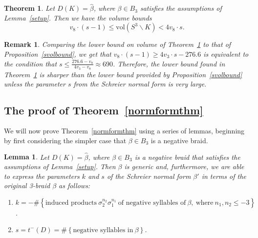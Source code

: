 \documentclass{article}
\newtheorem{remark}{Remark}[section]
\newtheorem{theorem}{Theorem}[section]
\newtheorem{lemma}{Lemma}[section]
\begin{document}
\begin{theorem}\label{newsvolbound}
Let $D(K)=\widehat{\beta}$, where $\beta \in B_{3}$ satisfies the assumptions of Lemma~\ref{setup}. Then we have the volume bounds
$$v_{8}\cdot(s-1) \leq \mathrm{vol}(S^{3}\backslash K) < 4v_{8}\cdot s.$$
\end{theorem}


 

\begin{remark}
Comparing the lower bound on volume of Theorem~\ref{newsvolbound} to that of Proposition~\ref{svolbound}, we get that $v_{8}\cdot (s-1) \geq 4v_{3}\cdot s-276.6$ is equivalent to the condition that $\displaystyle s \leq \frac{276.6-v_{8}}{4v_{3}-v_{8}} \approx 690$. Therefore, the lower bound found in Theorem~\ref{newsvolbound} is sharper than the lower bound provided by Proposition~\ref{svolbound} unless the parameter $s$ from the Schreier normal form is very large. 
\end{remark}









\subsection{The proof of Theorem~\ref{normformthm}}

We will now prove Theorem~\ref{normformthm} using a series of lemmas, beginning by first considering the simpler case that $\beta \in B_{3}$ is a negative braid. 

\begin{lemma} Let $D(K)=\widehat{\beta}$, where $\beta \in B_{3}$ is a negative braid that satisfies the assumptions of Lemma~\ref{setup}. Then $\beta$ is generic and, furthermore, we are able to express the parameters $k$ and $s$ of the Schreier normal form $\beta'$ in terms of the original 3-braid $\beta$ as follows:
\begin{enumerate}
\item[(1)] $k=-\# \left\{\text{induced\ products}\ \sigma_{2}^{n_{2}}\sigma_{1}^{n_{1}}\ \text{of\ negative\ syllables\ of}\ \beta,\ \text{where}\ n_{1}, n_{2} \leq -3 \right\}$.
\item[(2)] $s=t^{-}(D)=\#\left\{\text{negative\ syllables\ in}\ \beta \right\}$.
\end{enumerate}
\end{lemma}
\end{document}

